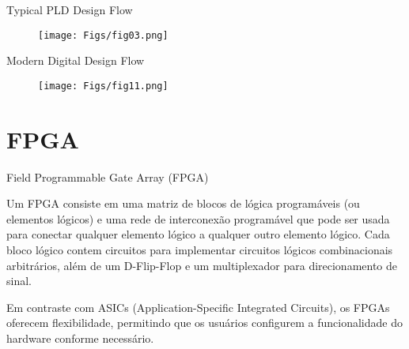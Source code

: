 \documentclass[aspectratio=169]{beamer}
\begin{document}
\begin{frame}{Typical PLD Design Flow}
	\justifying
	
	
	\begin{figure}[h]
		\centering
		\texttt{[image: Figs/fig03.png]}
	\end{figure}
	
	
\end{frame}

\begin{frame}{Modern Digital Design Flow}
	\justifying
	
	
	\begin{figure}[h]
		\centering
		\texttt{[image: Figs/fig11.png]}
	\end{figure}
	
	
\end{frame}
\section{FPGA}
\begin{frame}{Field Programmable Gate Array (FPGA)}
	\justifying
	

	
	\begin{block}{}
		\justifying
		Um FPGA consiste em uma matriz de blocos de lógica programáveis (ou elementos lógicos) e uma rede de interconexão programável que pode ser usada para conectar qualquer elemento lógico a qualquer outro elemento lógico. Cada bloco lógico contem circuitos para implementar circuitos lógicos combinacionais arbitrários, além de um D-Flip-Flop e um multiplexador para direcionamento de sinal. 
		
	\end{block}	

		
	\begin{block}{}
	\justifying
	Em contraste com ASICs (Application-Specific Integrated Circuits), os FPGAs oferecem flexibilidade, permitindo que os usuários configurem a funcionalidade do hardware conforme necessário.
	
	\end{block}			

\end{frame}
\end{document}
